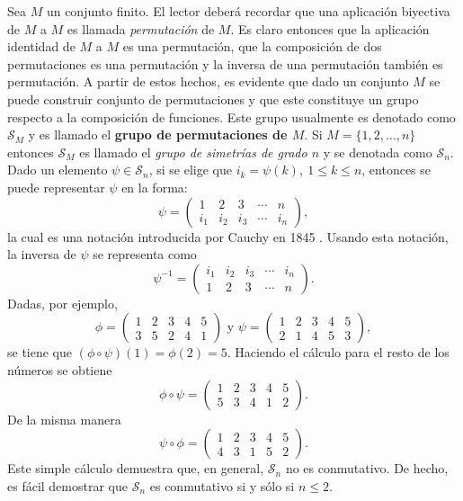 \begin{ejemplo}\label{ejemplo:simetrias}
Sea $M$ un conjunto finito. El lector deberá recordar que una aplicación biyectiva de $M$ a $M$ es llamada \textit{permutación} de $M$. Es claro entonces que la aplicación identidad de $M$ a $M$ es una permutación, que la composición de dos permutaciones es una permutación y la inversa de una permutación también es permutación. A partir de estos hechos, es evidente que dado un conjunto $M$ se puede construir conjunto de permutaciones y que este constituye un grupo respecto a la composición de funciones. Este grupo usualmente es denotado como $\mathcal{S}_M$ y es llamado el \textbf{grupo de permutaciones de $M$}. 
Si $M = \{  1,2,\dots, n \}$ entonces $\mathcal{S}_M$ es llamado el \textit{grupo de simetrías de grado $n$} y se denotada como $\mathcal{S}_n$. Dado un elemento $\psi \in \mathcal{S}_n$, si se elige que $i_k = \psi (k), \ 1 \leq k \leq n$, entonces se puede representar $\psi$ en la forma:
\[ \psi = \begin{pmatrix}
1 & 2 & 3 & \cdots & n \\
i_1 & i_2 & i_3 & \cdots & i_n
\end{pmatrix}, \]
la cual es una notación introducida por Cauchy en 1845 \cite[vol 1, p. 64-90]{bib:Cauchy}. Usando esta notación, la inversa de $\psi$ se representa como \[ \psi^{-1} = \begin{pmatrix}
i_1 & i_2 & i_3 & \cdots & i_n \\
1 & 2 & 3 & \cdots & n
\end{pmatrix}.
 \]
 Dadas, por ejemplo, \[ \phi = \begin{pmatrix}
 1 & 2 & 3 & 4 & 5 \\
 3 & 5 & 2 & 4 & 1
 \end{pmatrix} \mbox{ y } \psi = \begin{pmatrix}
 1 & 2 & 3 & 4 & 5 \\
  2 & 1 & 4 & 5 & 3
 \end{pmatrix}, \]
 se tiene que $(\phi \circ \psi)(1) = \phi(2) = 5$. Haciendo el cálculo para el resto de los números se obtiene \[ \phi \circ \psi = \begin{pmatrix}
 1 & 2 & 3 & 4 & 5 \\
  5 & 3 & 4 & 1 & 2
 \end{pmatrix}. \]
 De la misma manera \[ \psi \circ \phi = \begin{pmatrix}
 1 & 2 & 3 & 4 & 5 \\
  4 & 3 & 1 & 5 & 2
 \end{pmatrix}. \]
 Este simple cálculo demuestra que, en general, $\mathcal{S}_n$ no es conmutativo. De hecho, es fácil demostrar que $\mathcal{S}_n$ es conmutativo si y sólo si $n \leq 2$. 
\end{ejemplo}
